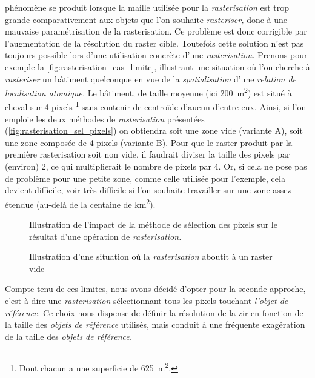 phénomène se produit lorsque la maille utilisée pour la
\emph{rasterisation} est trop grande comparativement aux objets que
l'on souhaite \emph{rasteriser,} donc à une mauvaise paramétrisation
de la rasterisation. Ce problème est donc corrigible par
l'augmentation de la résolution du raster cible. Toutefois cette
solution n'est pas toujours possible lors d'une utilisation concrète
d'une \emph{rasterisation.} Prenons pour exemple la
\autoref{fig:rasterisation_cas_limite}, illustrant une situation où
l'on cherche à \emph{rasteriser} un bâtiment quelconque en vue de la
\emph{spatialisation} d'une \emph{relation de localisation atomique.}
Le bâtiment, de taille moyenne (ici \SI{200}{\metre\squared}) est
situé à cheval sur 4 pixels \footnote{Dont chacun a une superficie de
  \SI{625}{\metre\squared}.} sans contenir de centroïde d'aucun
d'entre eux. Ainsi, si l'on emploie les deux méthodes de
\emph{rasterisation} présentées
(\autoref{fig:rasterisation_sel_pixels}) on obtiendra soit une zone
vide (variante \textcolor{RdBu-9-1}{\textsf{A}}), soit une zone
composée de 4 pixels (variante \textcolor{RdBu-9-9}{\textsf{B}}). Pour
que le raster produit par la première rasterisation soit non vide, il
faudrait diviser la taille des pixels par (environ) 2, ce qui
multiplierait le nombre de pixels par 4. Or, si cela ne pose pas de
problème pour une petite zone, comme celle utilisée pour l'exemple,
cela devient difficile, voir très difficile si l'on souhaite
travailler sur une zone assez étendue (au-delà de la centaine de
\si{\kilo\meter\squared}).

\begin{figure}
  \centering
  
  \caption{Illustration de l'impact de la méthode de sélection des
    pixels sur le résultat d'une opération de \emph{rasterisation.}}
  \label{fig:rasterisation_sel_pixels}
\end{figure}

\begin{figure}
  \centering
  
  \caption{Illustration d'une situation où la \emph{rasterisation}
    aboutit à un raster vide}
  \label{fig:rasterisation_cas_limite}
\end{figure}

Compte-tenu de ces limites, nous avons décidé d'opter pour la seconde
approche, c'est-à-dire une \emph{rasterisation} sélectionnant tous les
pixels touchant \emph{l'objet de référence.} Ce choix nous dispense de
définir la résolution de la \ac{zir} en fonction de la taille des
\emph{objets de référence} utilisés, mais conduit à une fréquente
exagération de la taille des \emph{objets de référence.}

